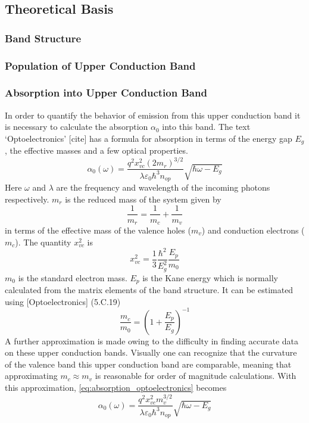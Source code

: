 \subsection{Theoretical Basis}

\subsubsection{Band Structure}

\subsubsection{Population of Upper Conduction Band}

\subsubsection{Absorption into Upper Conduction Band}

In order to quantify the behavior of emission from this upper conduction band it is necessary to calculate the absorption $\alpha_0$ into this band.
The text `Optoelectronics' [cite] has a formula for absorption in terms of the energy gap $E_g$, the effective masses and a few optical properties.
\begin{equation} \label{eq:absorption_optoelectronics}
  \alpha_0(\omega) = \frac{ q^2 x_{vc}^2 (2 m_r)^{3/2} }{ \lambda \varepsilon_0 \hbar^3 n_{op} } \sqrt{\hbar\omega - E_g}
\end{equation}
Here $\omega$ and $\lambda$ are the frequency and wavelength of the incoming photons respectively.
$m_r$ is the reduced mass of the system given by
\begin{equation}
  \frac{1}{m_r} = \frac{1}{m_c} + \frac{1}{m_v}
\end{equation}
in terms of the effective mass of the valence holes ($m_v$) and conduction electrons ($m_c$).
The quantity $x_{vc}^2$ is
\begin{equation}
  x_{vc}^2 = \frac{1}{3} \frac{\hbar^2}{E_g^2} \frac{E_p}{m_0}
\end{equation}
$m_0$ is the standard electron mass. $E_p$ is the Kane energy which is normally calculated from the matrix elements of the band structure.
It can be estimated using [Optoelectronics] (5.C.19)
\begin{equation}
  \frac{m_c}{m_0} = \left( 1 + \frac{E_p}{E_g} \right)^{-1}
\end{equation}
A further approximation is made owing to the difficulty in finding accurate data on these upper conduction bands.
Visually one can recognize that the curvature of the valence band this upper conduction band are comparable, meaning that approximating $ m_c \approx m_v $ is reasonable for order of magnitude calculations. With this approximation, \ref{eq:absorption_optoelectronics} becomes 
\begin{equation}
    \alpha_0(\omega) = \frac{ q^2 x_{vc}^2 m_v^{3/2} }{ \lambda \varepsilon_0 \hbar^3 n_{op} } \sqrt{\hbar\omega - E_g}
\end{equation}


